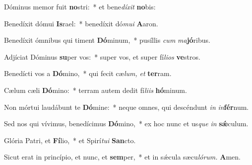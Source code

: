 \item Dóminus memor fuit \textbf{no}stri:~* et bene\textit{díxit} \textbf{no}bis:
\item Benedíxit dómui \textbf{Is}rael:~* benedíxit dó\textit{mui} \textbf{A}aron.
\item  Benedíxit ómnibus qui timent \textbf{Dó}minum,~* pusíllis \textit{cum} \textit{ma}\textbf{jó}ribus.
\item Adjíciat Dóminus \textbf{su}per vos:~* super vos, et super fí\textit{lios} \textbf{ve}stros.
\item Benedícti vos a \textbf{Dó}mino,~* qui fecit cæ\textit{lum,} \textit{et} \textbf{ter}ram.
\item Cælum cæli \textbf{Dó}mino:~* terram autem dedit fí\textit{liis} \textbf{hó}minum.
\item Non mórtui laudábunt te \textbf{Dó}mine:~* neque omnes, qui descéndunt \textit{in} \textit{in}\textbf{fér}num.
\item Sed nos qui vívimus, benedícimus \textbf{Dó}mino,~* ex hoc nunc et us\textit{que} \textit{in} \textbf{sǽ}culum.
\item Glória Patri, et \textbf{Fí}lio,~* et Spirí\hspace{0.03em}\textit{tui} \textbf{San}cto.
\item Sicut erat in princípio, et nunc, et \textbf{sem}per,~* et in sǽcula sæcu\hspace{0.03em}\textit{lórum.} \textbf{A}men.
